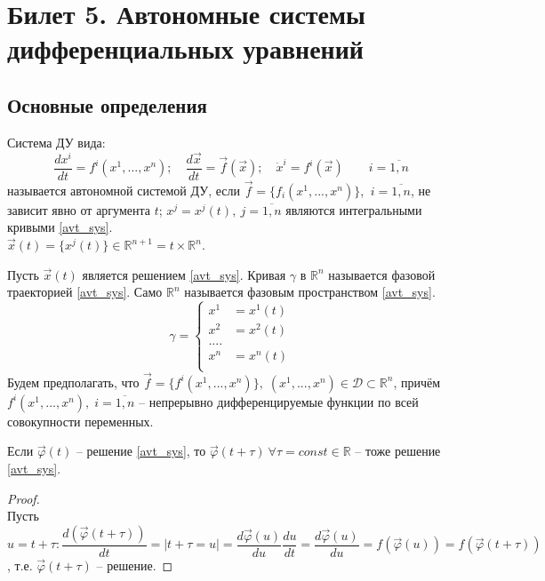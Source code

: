 
\section{Билет 5. Автономные системы дифференциальных уравнений}

\subsection{Основные определения}
Система ДУ вида: 
\begin{equation}\label{avt_sys}
	\frac{dx^i}{dt} = f^i(x^1, ..., x^n); \quad \frac{d\vec{x}}{dt} = \vec{f}(\vec{x}); \quad 	\dot{x}^i = f^i(\vec{x}) \quad \quad i = \overline{1, n}
\end{equation}
называется автономной системой ДУ, если $ \vec{f} = \{f_i(x^1, ..., x^n)\} $,  $\ i = \overline{1, n}$, не зависит явно от аргумента $ t $; $ x^j = x^j(t), \ j = \overline{1, n} $ являются интегральными кривыми \eqref{avt_sys}. \\ $\vec{x}(t) = \{ x^j(t) \} \in \mathbb{R}^{n+1} = t \times \mathbb{R}^n$.
\begin{definition}
	Пусть $ \vec{x}(t) $ является решением \eqref{avt_sys}. Кривая $ \gamma $ в $ \mathbb{R}^n $ называется фазовой траекторией \eqref{avt_sys}. Само $ \mathbb{R}^n $ называется фазовым пространством \eqref{avt_sys}.
	\begin{equation}\label{gamma_sys}
		\gamma = \left\{
			\begin{aligned}
				x^1 &= x^1(t) \\
				x^2 &=x^2(t) \\
				.... \\
				x^n &= x^n(t) \\
			\end{aligned}
		\right.
	\end{equation}
	Будем предполагать, что $ \vec{f} = \{ f^i(x^1, ..., x^n) \}, \; (x^1, ..., x^n) \in \mathscr{D} \subset \mathbb{R}^n$, причём $f^i(x^1, ..., x^n), \; i = \overline{1, n} $ -- непрерывно дифференцируемые функции по всей совокупности переменных.
\end{definition}

\begin{theorem}
	Если $ \vec \varphi(t) $ -- решение \eqref{avt_sys}, то $ \vec \varphi(t + \tau) \ \forall \tau = const \in \mathbb{R}$ -- тоже решение \eqref{avt_sys}.
\end{theorem}

\begin{proof}
	\ \\
	Пусть $ u = t + \tau: \dfrac{d(\vec \varphi(t + \tau))}{dt} = | t + \tau = u | = \dfrac{d \vec \varphi(u)}{du} \dfrac{du}{dt} = \dfrac{d \vec \varphi(u)}{du} = f(\vec \varphi(u)) = f(\vec \varphi(t + \tau))$, т.е. $\vec \varphi(t + \tau)$ -- решение.
\end{proof}


